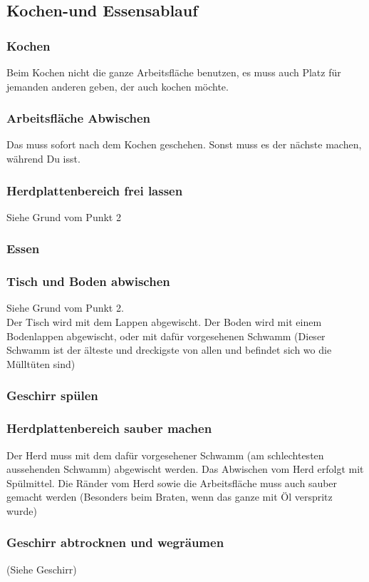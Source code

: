 \documentclass[10pt,a4paper,final]{article}
\begin{document}
\subsection{Kochen-und Essensablauf}
\subsubsection{Kochen} Beim Kochen nicht die ganze Arbeitsfläche benutzen, es muss auch Platz für jemanden anderen geben, der auch kochen möchte.
\subsubsection{Arbeitsfläche Abwischen} Das muss sofort nach dem Kochen geschehen. Sonst muss es der nächste machen, während Du isst.
\subsubsection{Herdplattenbereich frei lassen} Siehe Grund vom Punkt 2
\subsubsection{Essen}
\subsubsection{Tisch und Boden abwischen} Siehe Grund vom Punkt 2.\\ Der Tisch wird mit dem Lappen abgewischt. Der Boden wird mit einem Bodenlappen abgewischt, oder mit dafür vorgesehenen Schwamm (Dieser Schwamm ist der älteste und dreckigste von allen und befindet sich wo die Mülltüten sind)
\subsubsection{Geschirr spülen}
\subsubsection{Herdplattenbereich sauber machen} Der Herd muss mit dem dafür vorgesehener Schwamm (am schlechtesten aussehenden Schwamm) abgewischt werden. Das Abwischen vom Herd erfolgt mit Spülmittel. Die Ränder vom Herd sowie die Arbeitsfläche muss auch sauber gemacht werden (Besonders beim Braten, wenn das ganze mit Öl verspritz wurde)
\subsubsection{Geschirr abtrocknen und wegräumen} (Siehe Geschirr)
\end{document}
